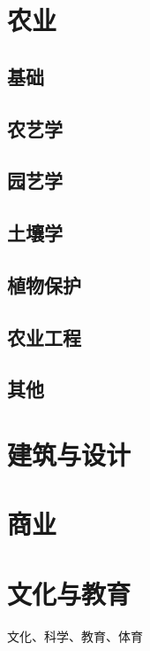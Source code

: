 \documentclass[UTF8]{ApplicationUniverse}
\begin{document}






\chapter{农业} %

\section{基础}

\section{农艺学}

\section{园艺学}

\section{土壤学}

\section{植物保护}

\section{农业工程}

\section{其他}


\chapter{建筑与设计}

\chapter{商业}

\chapter{文化与教育}

文化、科学、教育、体育
\end{document}

